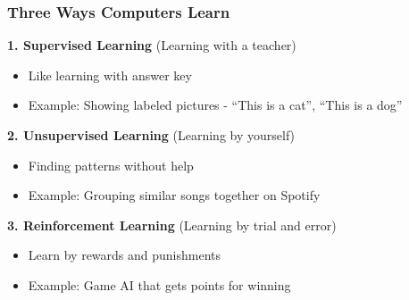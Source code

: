 \begin{frame}[fragile]\frametitle{Three Ways Computers Learn}

{\bf 1. Supervised Learning} (Learning with a teacher)
\begin{itemize}
\item Like learning with answer key
\item Example: Showing labeled pictures - ``This is a cat'', ``This is a dog''
\end{itemize}

{\bf 2. Unsupervised Learning} (Learning by yourself)
\begin{itemize}
\item Finding patterns without help
\item Example: Grouping similar songs together on Spotify
\end{itemize}

{\bf 3. Reinforcement Learning} (Learning by trial and error)
\begin{itemize}
\item Learn by rewards and punishments
\item Example: Game AI that gets points for winning
\end{itemize}

\end{frame}
